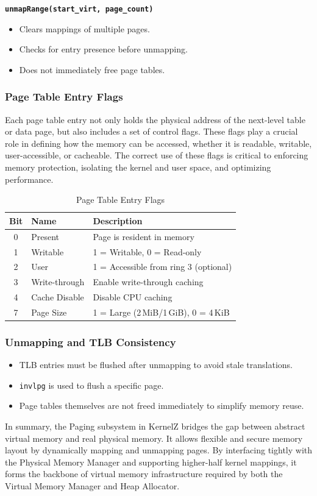 \documentclass[12pt]{extarticle}
\begin{document}
\vspace{0.5em}
\noindent\textbf{\texttt{unmapRange(start\_virt, page\_count)}}
\begin{itemize}
  \item Clears mappings of multiple pages.
  \item Checks for entry presence before unmapping.
  \item Does not immediately free page tables.
\end{itemize}

\subsubsection*{Page Table Entry Flags}

Each page table entry not only holds the physical address of the next-level table or data page, but also includes a set of control flags. These flags play a crucial role in defining how the memory can be accessed, whether it is readable, writable, user-accessible, or cacheable. The correct use of these flags is critical to enforcing memory protection, isolating the kernel and user space, and optimizing performance.

\begin{table}[H]
\centering
\begin{tabular}{|c|l|l|}
\hline
\textbf{Bit} & \textbf{Name} & \textbf{Description} \\
\hline
0 & Present & Page is resident in memory \\
1 & Writable & 1 = Writable, 0 = Read-only \\
2 & User & 1 = Accessible from ring 3 (optional) \\
3 & Write-through & Enable write-through caching \\
4 & Cache Disable & Disable CPU caching \\
7 & Page Size & 1 = Large (2\,MiB/1\,GiB), 0 = 4\,KiB \\
\hline
\end{tabular}
\caption{Page Table Entry Flags}
\end{table}

\subsubsection*{Unmapping and TLB Consistency}
\begin{itemize}
  \item TLB entries must be flushed after unmapping to avoid stale translations.
  \item \texttt{invlpg} is used to flush a specific page.
  \item Page tables themselves are not freed immediately to simplify memory reuse.
\end{itemize}
\vspace{1em}
\noindent
In summary, the Paging subsystem in KernelZ bridges the gap between abstract virtual memory and real physical memory. It allows flexible and secure memory layout by dynamically mapping and unmapping pages. By interfacing tightly with the Physical Memory Manager and supporting higher-half kernel mappings, it forms the backbone of virtual memory infrastructure required by both the Virtual Memory Manager and Heap Allocator.
\pagebreak
\end{document}
